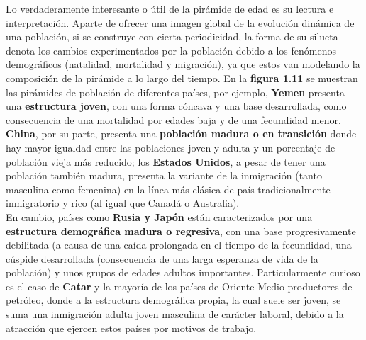 Lo verdaderamente interesante o \'util de la pir\'amide de edad es su lectura e interpretaci\'on. Aparte de ofrecer una imagen global de la evoluci\'on din\'amica de una poblaci\'on, si se construye con cierta periodicidad, la forma de su silueta denota los cambios experimentados por la poblaci\'on debido a los fen\'omenos demogr\'aficos (natalidad, mortalidad y migraci\'on), ya que estos van modelando la composici\'on de la pir\'amide a lo largo del tiempo. En la \textbf{figura 1.11} se muestran las pir\'amides de poblaci\'on de diferentes pa\'ises, por ejemplo, \textbf{Yemen} presenta una \textbf{estructura joven}, con una forma c\'oncava y una base desarrollada, como consecuencia de una mortalidad por edades baja y de una fecundidad menor. \textbf{China}, por su parte, presenta una \textbf{poblaci\'on madura o en transici\'on} donde hay mayor igualdad entre las poblaciones joven y adulta y un porcentaje de poblaci\'on vieja m\'as reducido; los \textbf{Estados Unidos}, a pesar de tener una poblaci\'on tambi\'en madura, presenta la variante de la inmigraci\'on (tanto masculina como femenina) en la l\'inea m\'as cl\'asica de pa\'is tradicionalmente inmigratorio y rico (al igual que Canad\'a o Australia).\\ 

En cambio, pa\'ises como \textbf{Rusia y Jap\'on} est\'an caracterizados por una \textbf{estructura demogr\'afica madura o regresiva}, con una base progresivamente debilitada (a causa de una ca\'ida prolongada en el tiempo de la fecundidad, una c\'uspide desarrollada (consecuencia de una larga esperanza de vida de la poblaci\'on) y unos grupos de edades adultos importantes. Particularmente curioso es el caso de \textbf{Catar} y la mayor\'ia de los pa\'ises de Oriente Medio productores de petr\'oleo, donde a la estructura demogr\'afica propia, la cual suele ser joven, se suma una inmigraci\'on adulta joven masculina de car\'acter laboral, debido a la atracci\'on que ejercen estos pa\'ises por motivos de trabajo.\\

